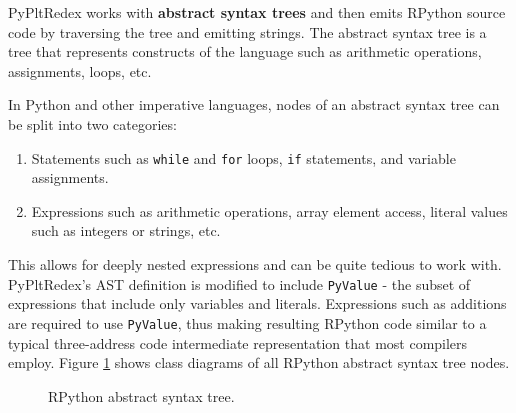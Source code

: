 PyPltRedex works with \textbf{abstract syntax trees} and then emits RPython source code by traversing the tree and emitting strings. The abstract syntax tree is a tree that represents constructs of the language such as arithmetic operations, assignments, loops, etc.

In Python and other imperative languages, nodes of an abstract syntax tree can be split into two categories:

\begin{enumerate}
\item
Statements such as \texttt{while} and \texttt{for} loops, \texttt{if} statements, and variable assignments.
\item
Expressions such as arithmetic operations, array element access, literal values such as integers or strings, etc.
\end{enumerate}

This allows for deeply nested expressions and can be quite tedious to work with. PyPltRedex's AST definition is modified to include \texttt{PyValue} - the subset of expressions that include only variables and literals. Expressions such as additions are required to use \texttt{PyValue}, thus making resulting RPython code similar to a typical three-address code intermediate representation that most compilers employ. Figure \ref{class-diagram-rpython} shows class diagrams of all RPython abstract syntax tree nodes.

\begin{figure}[ht]
	\centering
	\caption{RPython abstract syntax tree.}
\label{class-diagram-rpython}
\end{figure}
